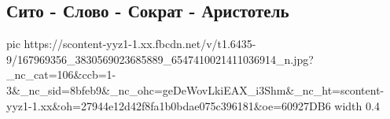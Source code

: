  
 
 
 
 
\subsection{Сито - Слово - Сократ - Аристотель}

\ifcmt
  pic https://scontent-yyz1-1.xx.fbcdn.net/v/t1.6435-9/167969356_3830569023685889_6547410021411036914_n.jpg?_nc_cat=106&ccb=1-3&_nc_sid=8bfeb9&_nc_ohc=geDeWovLkiEAX_i3Shm&_nc_ht=scontent-yyz1-1.xx&oh=27944e12d42f8fa1b0bdae075c396181&oe=60927DB6
  width 0.4
\fi
